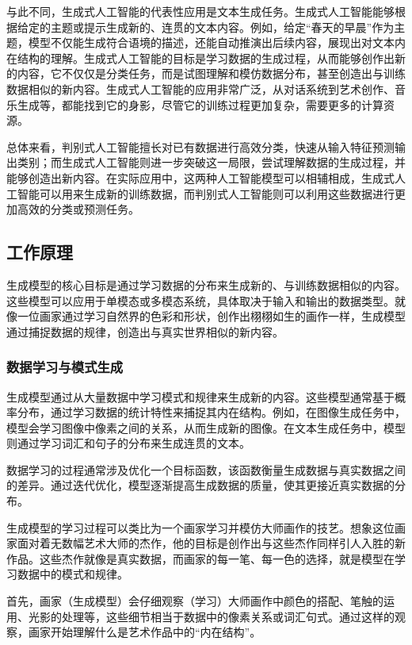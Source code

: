 与此不同，生成式人工智能的代表性应用是文本生成任务。生成式人工智能能够根据给定的主题或提示生成新的、连贯的文本内容。例如，给定“春天的早晨”作为主题，模型不仅能生成符合语境的描述，还能自动推演出后续内容，展现出对文本内在结构的理解。生成式人工智能的目标是学习数据的生成过程，从而能够创作出新的内容，它不仅仅是分类任务，而是试图理解和模仿数据分布，甚至创造出与训练数据相似的新内容。生成式人工智能的应用非常广泛，从对话系统到艺术创作、音乐生成等，都能找到它的身影，尽管它的训练过程更加复杂，需要更多的计算资源。

总体来看，判别式人工智能擅长对已有数据进行高效分类，快速从输入特征预测输出类别；而生成式人工智能则进一步突破这一局限，尝试理解数据的生成过程，并能够创造出新内容。在实际应用中，这两种人工智能模型可以相辅相成，生成式人工智能可以用来生成新的训练数据，而判别式人工智能则可以利用这些数据进行更加高效的分类或预测任务。

\subsection{工作原理}

生成模型的核心目标是通过学习数据的分布来生成新的、与训练数据相似的内容。这些模型可以应用于单模态或多模态系统，具体取决于输入和输出的数据类型。就像一位画家通过学习自然界的色彩和形状，创作出栩栩如生的画作一样，生成模型通过捕捉数据的规律，创造出与真实世界相似的新内容。

\subsubsection{数据学习与模式生成}

生成模型通过从大量数据中学习模式和规律来生成新的内容。这些模型通常基于概率分布，通过学习数据的统计特性来捕捉其内在结构。例如，在图像生成任务中，模型会学习图像中像素之间的关系，从而生成新的图像。在文本生成任务中，模型则通过学习词汇和句子的分布来生成连贯的文本。

数据学习的过程通常涉及优化一个目标函数，该函数衡量生成数据与真实数据之间的差异。通过迭代优化，模型逐渐提高生成数据的质量，使其更接近真实数据的分布。

生成模型的学习过程可以类比为一个画家学习并模仿大师画作的技艺。想象这位画家面对着无数幅艺术大师的杰作，他的目标是创作出与这些杰作同样引人入胜的新作品。这些杰作就像是真实数据，而画家的每一笔、每一色的选择，就是模型在学习数据中的模式和规律。

首先，画家（生成模型）会仔细观察（学习）大师画作中颜色的搭配、笔触的运用、光影的处理等，这些细节相当于数据中的像素关系或词汇句式。通过这样的观察，画家开始理解什么是艺术作品中的“内在结构”。

